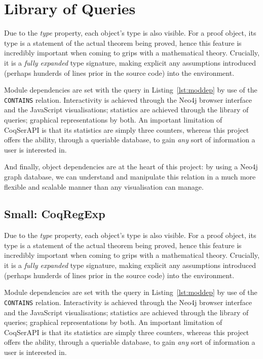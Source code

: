 \section{Library of Queries}\label{sec:libeval}

Due to the \emph{type} property, each object's type is also visible. For a proof
object, its type is a statement of the actual theorem being proved, hence this
feature is incredibly important when coming to grips with a mathematical theory.
Crucially, it is a \emph{fully expanded} type signature, making explicit any
assumptions introduced (perhaps hunderds of lines prior in the source code) into
the environment.

Module dependencies are set with the query in Listing~\ref{lst:moddep} by use of
the \texttt{CONTAINS} relation.  Interactivity is achieved through the Neo4j
browser interface and the JavaScript visualisations; statistics are achieved
through the library of queries; graphical representations by both. An important
limitation of CoqSerAPI is that its statistics are simply three counters,
whereas this project offers the ability, through a queriable database, to gain
\emph{any} sort of information a user is interested in.

And finally, object dependencies are at the heart of this project: by using a
Neo4j graph database, we can understand and manipulate this relation in a much
more flexible and scalable manner than any visualisation can manage.

\subsection{Small: CoqRegExp}

Due to the \emph{type} property, each object's type is also visible. For a proof
object, its type is a statement of the actual theorem being proved, hence this
feature is incredibly important when coming to grips with a mathematical theory.
Crucially, it is a \emph{fully expanded} type signature, making explicit any
assumptions introduced (perhaps hunderds of lines prior in the source code) into
the environment.

Module dependencies are set with the query in Listing~\ref{lst:moddep} by use of
the \texttt{CONTAINS} relation.  Interactivity is achieved through the Neo4j
browser interface and the JavaScript visualisations; statistics are achieved
through the library of queries; graphical representations by both. An important
limitation of CoqSerAPI is that its statistics are simply three counters,
whereas this project offers the ability, through a queriable database, to gain
\emph{any} sort of information a user is interested in.

